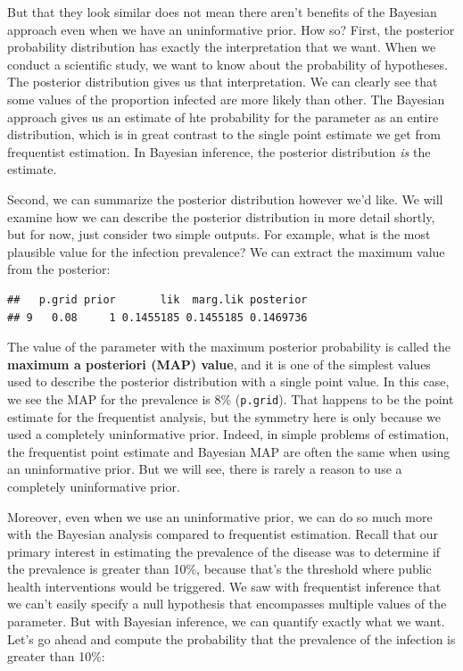 \documentclass[
]{book}
\newenvironment{Shaded}{\begin{snugshade}}{\end{snugshade}}
\newcommand{\CommentTok}[1]{\textcolor[rgb]{0.56,0.35,0.01}{\textit{#1}}}
\newcommand{\FunctionTok}[1]{\textcolor[rgb]{0.13,0.29,0.53}{\textbf{#1}}}
\newcommand{\NormalTok}[1]{#1}
\newcommand{\SpecialCharTok}[1]{\textcolor[rgb]{0.81,0.36,0.00}{\textbf{#1}}}
\begin{document}
But that they look similar does not mean there aren't benefits of the Bayesian approach even when we have an uninformative prior. How so? First, the posterior probability distribution has exactly the interpretation that we want. When we conduct a scientific study, we want to know about the probability of hypotheses. The posterior distribution gives us that interpretation. We can clearly see that some values of the proportion infected are more likely than other. The Bayesian approach gives us an estimate of hte probability for the parameter as an entire distribution, which is in great contrast to the single point estimate we get from frequentist estimation. In Bayesian inference, the posterior distribution \emph{is} the estimate.

Second, we can summarize the posterior distribution however we'd like. We will examine how we can describe the posterior distribution in more detail shortly, but for now, just consider two simple outputs. For example, what is the most plausible value for the infection prevalence? We can extract the maximum value from the posterior:

\begin{Shaded}
\end{Shaded}

\begin{verbatim}
##   p.grid prior       lik  marg.lik posterior
## 9   0.08     1 0.1455185 0.1455185 0.1469736
\end{verbatim}

The value of the parameter with the maximum posterior probability is called the \textbf{maximum a posteriori (MAP) value}, and it is one of the simplest values used to describe the posterior distribution with a single point value. In this case, we see the MAP for the prevalence is 8\% (\texttt{p.grid}). That happens to be the point estimate for the frequentist analysis, but the symmetry here is only because we used a completely uninformative prior. Indeed, in simple problems of estimation, the frequentist point estimate and Bayesian MAP are often the same when using an uninformative prior. But we will see, there is rarely a reason to use a completely uninformative prior.

Moreover, even when we use an uninformative prior, we can do so much more with the Bayesian analysis compared to frequentist estimation. Recall that our primary interest in estimating the prevalence of the disease was to determine if the prevalence is greater than 10\%, because that's the threshold where public health interventions would be triggered. We saw with frequentist inference that we can't easily specify a null hypothesis that encompasses multiple values of the parameter. But with Bayesian inference, we can quantify exactly what we want. Let's go ahead and compute the probability that the prevalence of the infection is greater than 10\%:
\end{document}

